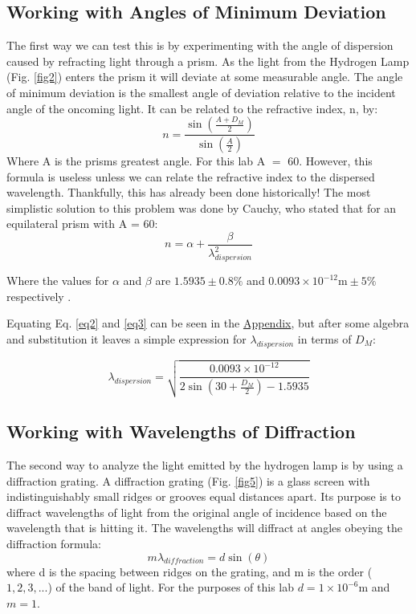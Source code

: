 \documentclass[letterpaper,11pt] {article}
\begin{document}
\subsection{Working with Angles of Minimum Deviation}
The first way we can test this is by experimenting with the angle of dispersion caused by refracting light through a prism. As the light from the Hydrogen Lamp (Fig. \ref{fig2}) enters the prism it will deviate at some measurable angle. The angle of minimum deviation is the smallest angle of deviation relative to the incident angle of the oncoming light. It can be related to the refractive index, n, by: 
\begin{equation} \label{eq2}
    n = \frac{\sin\left(\frac{A + D_M}{2}\right)}{\sin(\frac{A}{2})}
\end{equation}
Where A is the prisms greatest angle. For this lab A $=$ 60\textdegree. 
However, this formula is useless unless we can relate the refractive index to the dispersed wavelength. Thankfully, this has already been done historically! The most simplistic solution to this problem was done by Cauchy, who stated that for an equilateral prism with A = 60\textdegree: 
\begin{equation} \label{eq3}
    n = \alpha + \frac{\beta}{\lambda_{dispersion}^2}
\end{equation}

Where the values for $\alpha$ and $\beta$ are $1.5935\pm0.8\%$ and $0.0093\times10^{-12} \text{m}\pm5\%$ respectively \cite{lab manual}.

Equating Eq. \ref{eq2} and \ref{eq3} can be seen in the \hyperref[append]{Appendix}, but after some algebra and substitution it leaves a simple expression for $\lambda_{dispersion}$ in terms of $D_M$:

\begin{equation} \label{eq4}
    \lambda_{dispersion} = \sqrt{\frac{0.0093\times 10^{-12}}{2\sin\left(30+\frac{D_M}{2}\right) - 1.5935}}
\end{equation}

\subsection{Working with Wavelengths of Diffraction}

The second way to analyze the light emitted by the hydrogen lamp is by using a diffraction grating. A diffraction grating (Fig. \ref{fig5}) is a glass screen with indistinguishably small ridges or grooves equal distances apart. Its purpose is to diffract wavelengths of light from the original angle of incidence based on the wavelength that is hitting it. The wavelengths will diffract at angles obeying the diffraction formula: 
\begin{equation} \label{eq5}
    m\lambda_{diffraction} = d \sin(\theta)
\end{equation}
where d is the spacing between ridges on the grating, and m is the order ($1,2,3,...$) of the band of light. For the purposes of this lab $d = 1\times 10^{-6}$m and $m=1$.
\end{document}
